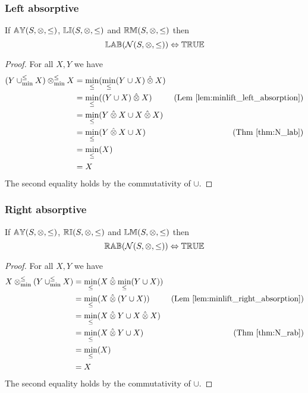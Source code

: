 \documentclass[../Summary.tex]{subfiles}
\begin{document}
\subsubsection{Left absorptive}

\begin{theorem} \label{thm:M_lab}
If ${\mathbb{AY}}(S,\otimes,\leq)$, ${\mathbb{LI}}(S,\otimes,\leq)$ and ${\mathbb{RM}}(S,\otimes,\leq)$ then
\begin{equation*}
{\mathbb{LAB}}(\mathcal{N}(S,\otimes,\leq)) \Leftrightarrow {\mathbb{TRUE}}
\end{equation*}
\end{theorem}


\begin{proof}

\vspace{0.5em}
For all $X, Y$ we have
\begin{align*}
(Y \mathbin{\cup_{\min}^{\leq}} X) \mathbin{\otimes_{\min}^{\leq}} X 	& = \min_\leq(\min_\leq(Y \cup X) \mathbin{\hat{\otimes}} X) \\
							& = \min_\leq((Y \cup X) \mathbin{\hat{\otimes}} X) & \text{(Lem \ref{lem:minlift_left_absorption})} \\
							& = \min_\leq(Y \mathbin{\hat{\otimes}} X \cup X \mathbin{\hat{\otimes}} X) \\
							& = \min_\leq(Y \mathbin{\hat{\otimes}} X \cup X) & \text{(Thm \ref{thm:N_lab})} \\
							& = \min_\leq(X) \\
							& = X
\end{align*}
The second equality holds by the commutativity of $\cup$.
\end{proof}




\subsubsection{Right absorptive}

\begin{theorem} \label{thm:M_rab}
If ${\mathbb{AY}}(S,\otimes,\leq)$, ${\mathbb{RI}}(S,\otimes,\leq)$ and ${\mathbb{LM}}(S,\otimes,\leq)$ then
\begin{equation*}
{\mathbb{RAB}}(\mathcal{N}(S,\otimes,\leq)) \Leftrightarrow {\mathbb{TRUE}}
\end{equation*}
\end{theorem}


\begin{proof}

\vspace{0.5em}
For all $X, Y$ we have
\begin{align*}
X \mathbin{\otimes_{\min}^{\leq}} (Y \mathbin{\cup_{\min}^{\leq}} X) 	& = \min_\leq(X \mathbin{\hat{\otimes}} \min_\leq(Y \cup X)) \\
							& = \min_\leq(X \mathbin{\hat{\otimes}} (Y \cup X)) & \text{(Lem \ref{lem:minlift_right_absorption})} \\
							& = \min_\leq(X \mathbin{\hat{\otimes}} Y \cup X \mathbin{\hat{\otimes}} X) \\
							& = \min_\leq(X \mathbin{\hat{\otimes}} Y \cup X) & \text{(Thm \ref{thm:N_rab})} \\
							& = \min_\leq(X) \\
							& = X
\end{align*}
The second equality holds by the commutativity of $\cup$.
\end{proof}
\end{document}

